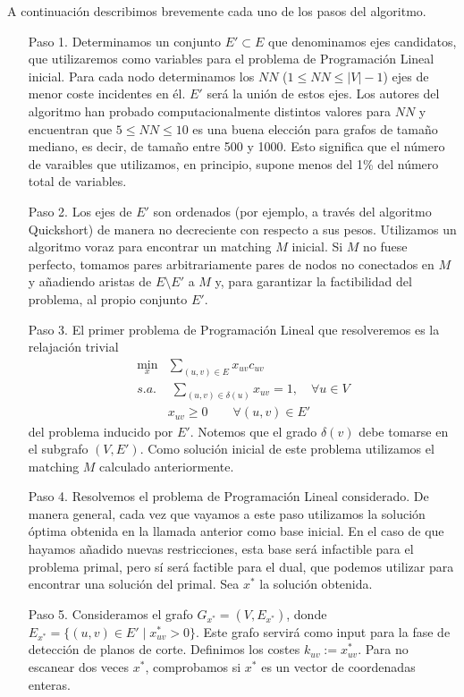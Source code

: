 \documentclass[twoside,a4paper,openright,12pt]{book}
\begin{document}
\newpage
A continuación describimos brevemente cada uno de los pasos del algoritmo.
\begin{itemize}
\item[Paso 1.] Determinamos un conjunto $E'\subset E$ que denominamos ejes candidatos, que utilizaremos como variables para el problema de Programación Lineal inicial. Para cada nodo determinamos los $NN$ ($1\leq NN \leq |V|-1$) ejes de menor coste incidentes en él. $E'$ será la unión de estos ejes. Los autores del algoritmo han probado computacionalmente distintos valores para $NN$ y encuentran que $5\leq NN \leq 10$ es una buena elección para grafos de tamaño mediano, es decir, de tamaño entre 500 y 1000. Esto significa que el número de varaibles que utilizamos, en principio, supone menos del 1\% del número total de variables. 
\item[Paso 2.] Los ejes de $E'$ son ordenados (por ejemplo, a través del algoritmo Quickshort) de manera no decreciente con respecto a sus pesos. Utilizamos un algoritmo voraz para encontrar un matching $M$ inicial. Si $M$ no fuese perfecto, tomamos pares arbitrariamente pares de nodos no conectados en $M$ y añadiendo aristas de $E\setminus E'$ a $M$ y, para garantizar la factibilidad del problema, al propio conjunto $E'$. 
\item[Paso 3.] El primer problema de Programación Lineal que resolveremos es la relajación trivial 
\begin{align*}
\min_x & \sum_{(u,v) \in E}x_{uv}c_{uv}\\
s.a.&\;\sum_{(u,v)\in\delta(u)} x_{uv} = 1, \quad \forall u \in V\\
&x_{uv} \geq 0 \qquad \forall(u,v)\in E'
\end{align*}
del problema inducido por $E'$. Notemos que el grado $\delta(v)$ debe tomarse en el subgrafo $(V,E')$. Como solución inicial de este problema utilizamos el matching $M$ calculado anteriormente.
\item[Paso 4.] Resolvemos el problema de Programación Lineal considerado. De manera general, cada vez que vayamos a este paso utilizamos la solución óptima obtenida en la llamada anterior como base inicial. En el caso de que hayamos añadido nuevas restricciones, esta base será infactible para el problema primal, pero sí será factible para el dual, que podemos utilizar para encontrar una solución del primal. Sea $x^*$ la solución obtenida.
\item[Paso 5.] Consideramos el grafo $G_{x^*}=(V,E_{x^*})$, donde $E_{x^*} =\{(u,v)\in E'\mid x^*_{uv}>0\}$. Este grafo servirá como input para la fase de detección de planos de corte. Definimos los costes $k_{uv}:=x^*_{uv}$. Para no escanear dos veces $x^*$, comprobamos si $x^*$ es un vector de coordenadas enteras.

\end{itemize}
\end{document}
